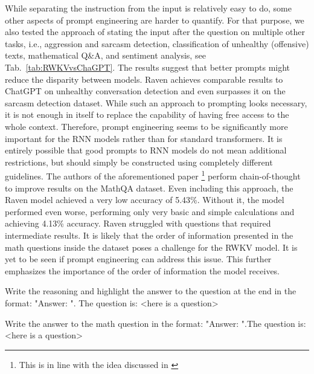 \documentclass[11pt]{article}
\begin{document}
While separating the instruction from the input is relatively easy to do, some other aspects of prompt engineering are harder to quantify. For that purpose, we also tested the approach of stating the input after the question on multiple other tasks, i.e., aggression and sarcasm detection, classification of unhealthy (offensive) texts, mathematical Q\&A, and sentiment analysis, see Tab.~\ref{tab:RWKVvsChaGPT}. The results suggest that better prompts might reduce the disparity between models. Raven achieves comparable results to ChatGPT on unhealthy conversation detection and even surpasses it on the sarcasm detection dataset. While such an approach to prompting looks necessary, it is not enough in itself to replace the capability of having free access to the whole context. Therefore, prompt engineering seems to be significantly more important for the RNN models rather than for standard transformers. It is entirely possible that good prompts to RNN models do not mean additional restrictions, but should simply be constructed using completely different guidelines. The authors of the aforementioned paper \cite{kocon2023chatgpt}\footnote{This is in line with the idea discussed in \cite{wei2022chain}} perform chain-of-thought to improve results on the MathQA dataset. Even including this approach, the Raven model achieved a very low accuracy of 5.43\%. Without it, the model performed even worse, performing only very basic and simple calculations and achieving 4.13\% accuracy. Raven struggled with questions that required intermediate results. It is likely that the order of information presented in the math questions inside the dataset poses a challenge for the RWKV model. It is yet to be seen if prompt engineering can address this issue. This further emphasizes the importance of the order of information the model receives. \\

\begin{tcolorbox}[colback=white,colframe=black!75!black,title=Template used to prompt the Raven model in MathQA with chain-of-thought]
    Write the reasoning and highlight the answer to the question at the end in the format: "Answer: ". The question is: <here is a question>
\end{tcolorbox}

\begin{tcolorbox}[colback=white,colframe=black!75!black,title=Template used to prompt the Raven model in MathQA without chain-of-thought]
    Write the answer to the math question in the format: "Answer: ".\newline The question is: <here is a question>
\end{tcolorbox}
\end{document}
